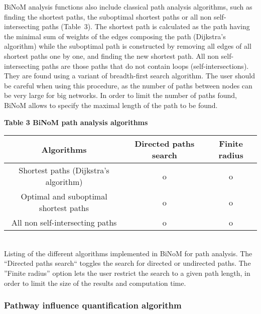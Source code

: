 \documentclass[11pt]{bmc_article_s50}
\newenvironment{bmcformat}{\begin{raggedright}\baselineskip20pt\sloppy\setboolean{publ}{false}}{\end{raggedright}\baselineskip20pt\sloppy}
\begin{document}
\begin{bmcformat}
BiNoM analysis functions also include classical path analysis
algorithms, such as finding the shortest paths, the suboptimal shortest paths or
all non self-intersecting paths (Table~3). The shortest path is calculated as the path having
the minimal sum of weights of the edges composing the path (Dijkstra's
algorithm) while the suboptimal path is constructed by removing all edges of
all shortest paths one by one, and finding the new shortest path. All non self-intersecting paths
are those paths that do not contain loops (self-intersections). They are found using a variant
of breadth-first search algorithm. The user should be careful when using this procedure, as the
number of paths between nodes can be
very large for big networks. In order to limit the number of paths found, BiNoM
allows to specify the maximal length of the path to be found.

\begin{table}[!h]
  \textbf{Table 3 BiNoM path analysis algorithms}

 \begin{tabular*}{\textwidth}{@{\extracolsep\fill}ccc}
        \hline
    \textbf{Algorithms} & \textbf{Directed paths search} &  \textbf{Finite radius} \\
     \hline
        Shortest paths (Dijkstra's algorithm) & o & o \\
        \hline
        Optimal and suboptimal shortest paths & o & o  \\
        \hline
        All non self-intersecting paths & o  & o  \\
        \hline
      \end{tabular*}\\
      Listing of the different algorithms implemented in BiNoM for
path analysis. The ``Directed paths search`` toggles the search for directed or
undirected paths. The ''Finite radius'' option lets the user restrict the search
to a given path length, in order to limit the size of the results and computation time.
      \end{table}

\subsubsection*{Pathway influence quantification algorithm}


\end{bmcformat}
\end{document}
